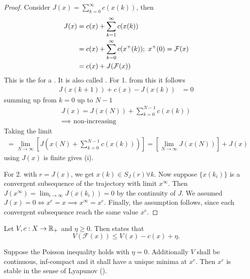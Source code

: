 \begin{proof}
    Consider \(J(x)=\sum_{k=0}^\infty c(x(k))\), then 
    \begin{align*}
        J(x) &= c(x)+\sum_{k=1}^\infty c(x(k))\\
        &=c(x)+\sum_{k=0}^\infty c(x^+(k)); \ x^+(0)=\mathcal{F}(x)\\
        &=c(x)+ J(\mathcal{F}(x))
    \end{align*}
    This is the  for a .
    It is also called .
    For 1. from this it follows \begin{align*}
        J(x(k+1))+c(x)-J(x(k)) &= 0
    \end{align*}
    summing up from \(k=0\) up to \(N-1\)
    \begin{align*}
        J(x)=J(x(N))+\sum_{k=0}^{N-1}c(x(k))\\ \implies \text{ non-increasing}
    \end{align*}
    Taking the limit
    \begin{align*}
        =\lim_{N\to\infty}\left[J(x(N)+\sum_{k=0}^{N-1}c(x(k)))\right]=\left[\lim_{N\to\infty} J(x(N))\right]+J(x)
    \end{align*}
    using \(J(x)\) is finite gives (i).


    For 2. with \(r=J(x)\), we get \(x(k)\in S_J(r)\forall k\). Now suppose \(\{x(k_i)\}\) is a convergent subsequence
    of the trajectory with limit \(x^\infty\). Then \(J(x^\infty)=\lim_{i\to\infty}J(x(k_i))=0\) by the continuity of \(J\).
    We assumed \(J(x)=0 \iff x^e=x\implies x^\infty=x^e.\) Finally, the assumption follows, since each convergent subsequence reach the same value \(x^e\).

\end{proof}

\begin{definition}\label{def:1.9}
    Let \(V,c:X\to\mathbb{R}_+\) and \(\eta\geq 0\). Then  states that 
    \[V(\mathcal{F}(x))\leq V(x)-c(x)+\eta.\]
\end{definition}


\begin{proposition}\label{prop:1.10}
    Suppose the Poisson inequality holds with \(\eta=0\). Additionally
    \(V\) shall be continuous, inf-compact and it shall have a unique minima at $x^e$. Then \(x^e\)
    is stable in the sense of Lyapunov ().    
\end{proposition}

